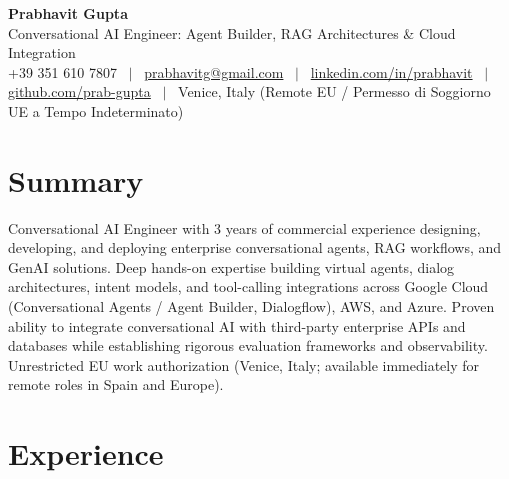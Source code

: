 \documentclass[a4paper,10pt]{article}
\begin{document}
\begin{minipage}[c]{0.80\textwidth}
  {\Huge\bfseries Prabhavit Gupta}\\[3pt]
  {\color{accent}\large Conversational AI Engineer: Agent Builder, RAG Architectures \& Cloud Integration}\\[6pt]
  {\footnotesize +39 351 610 7807 ~$\vert$~
  \href{mailto:prabhavitg@gmail.com}{prabhavitg@gmail.com} ~$\vert$~
  \href{https://www.linkedin.com/in/prabhavit/}{linkedin.com/in/prabhavit} ~$\vert$~
  \href{https://github.com/prab-gupta}{github.com/prab-gupta} ~$\vert$~
  Venice, Italy (Remote EU / Permesso di Soggiorno UE a Tempo Indeterminato)}
\end{minipage}\hfill

\section{Summary}
Conversational AI Engineer with 3 years of commercial experience designing, developing, and deploying enterprise conversational agents, RAG workflows, and GenAI solutions. Deep hands-on expertise building virtual agents, dialog architectures, intent models, and tool-calling integrations across Google Cloud (Conversational Agents / Agent Builder, Dialogflow), AWS, and Azure. Proven ability to integrate conversational AI with third-party enterprise APIs and databases while establishing rigorous evaluation frameworks and observability. Unrestricted EU work authorization (Venice, Italy; available immediately for remote roles in Spain and Europe).

\section{Experience}
\end{document}
